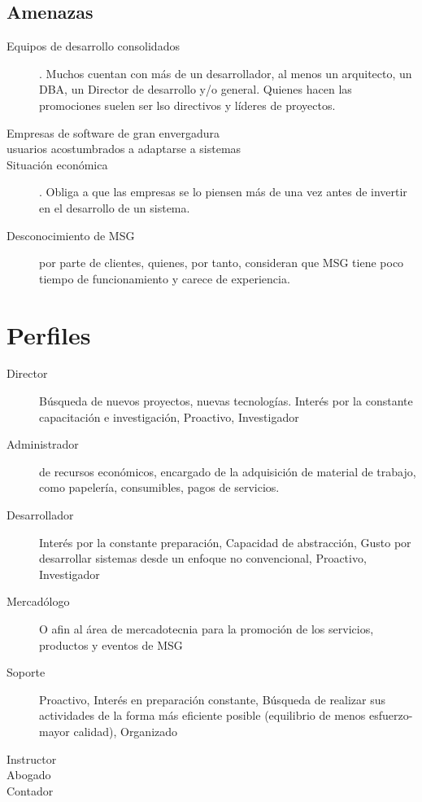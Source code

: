 \documentclass[12pt,spanish,lettersize]{report}
\begin{document}
\subsection{Amenazas}
\begin{description}
\item[Equipos de desarrollo consolidados]. Muchos cuentan con m\'as de un desarrollador, al menos un arquitecto, un DBA, un Director de desarrollo y/o general. Quienes hacen las promociones suelen ser lso directivos y l\'ideres de proyectos.
\item[Empresas de software de gran envergadura]
\item[usuarios acostumbrados a adaptarse a sistemas]
\item[Situaci\'on econ\'omica]. Obliga a que las empresas se lo piensen m\'as de una vez antes de invertir en el desarrollo de un sistema.
\item[Desconocimiento de MSG] por parte de clientes, quienes, por tanto, consideran que MSG tiene poco tiempo de funcionamiento y carece de experiencia.
\end{description}
\section{Perfiles}
\begin{description}
\item[Director] B\'usqueda de nuevos proyectos, nuevas tecnolog\'ias. Inter\'es por la constante capacitaci\'on e investigaci\'on, Proactivo, Investigador
\item[Administrador] de recursos econ\'omicos, encargado de la adquisici\'on de material de trabajo, como papeler\'ia, consumibles, pagos de servicios.
\item[Desarrollador] Inter\'es por la constante preparaci\'on, Capacidad de abstracci\'on, Gusto por desarrollar sistemas desde un enfoque no convencional, Proactivo, Investigador
\item[Mercad\'ologo] O afin al \'area de mercadotecnia para la promoci\'on de los servicios, productos y eventos de MSG
\item[Soporte] Proactivo, Inter\'es en preparaci\'on constante, B\'usqueda de realizar sus actividades de la forma m\'as eficiente posible (equilibrio de menos esfuerzo-mayor calidad), Organizado
\item[Instructor]
\item[Abogado]
\item[Contador]
\end{description}
\end{document}
